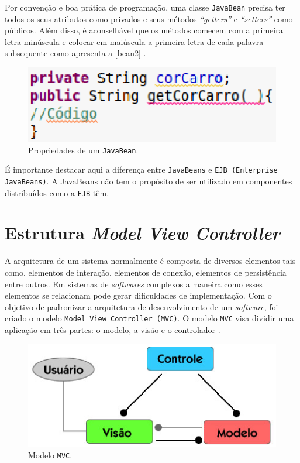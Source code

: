 Por convenção e boa prática de programação, uma classe \texttt{JavaBean} precisa ter todos os seus atributos como privados e seus métodos \textit{“getters”} e \textit{“setters”}
como públicos. Além disso, é aconselhável que os métodos comecem com a primeira letra minúscula e colocar em maiúscula a primeira letra de 
cada palavra subsequente como apresenta a \autoref{bean2} \cite{paulojsp}.

\begin{figure}[h]
	\centering
	\caption{\label{bean2}Propriedades de um \texttt{JavaBean}.}
		\includegraphics[keepaspectratio=true,scale=0.7]{figuras/bean2.eps}
\end{figure}

É importante destacar aqui a diferença entre \texttt{JavaBeans} e \texttt{EJB (Enterprise JavaBeans)}. A JavaBeans não tem o propósito de ser utilizado em 
componentes distribuídos como a \texttt{EJB} têm.

\section{Estrutura \textit{Model View Controller}}

A arquitetura de um sistema normalmente é composta de diversos elementos tais como, elementos de interação, elementos de conexão, elementos 
de persistência entre outros. Em sistemas de \textit{softwares} complexos a maneira como esses elementos se relacionam pode gerar dificuldades de 
implementação. Com o objetivo de padronizar a arquitetura de desenvolvimento de um \textit{software}, foi criado o modelo \texttt{Model View Controller (MVC)}.
O modelo \texttt{MVC} visa dividir uma aplicação em três partes: o modelo, a visão e o controlador \cite[p.~1]{devmediamvc}.

\begin{figure}[h]
	\centering
	\caption{\label{mvc}Modelo \texttt{MVC}.}
		\includegraphics[keepaspectratio=true,scale=1]{figuras/mvc.eps}
\end{figure}

